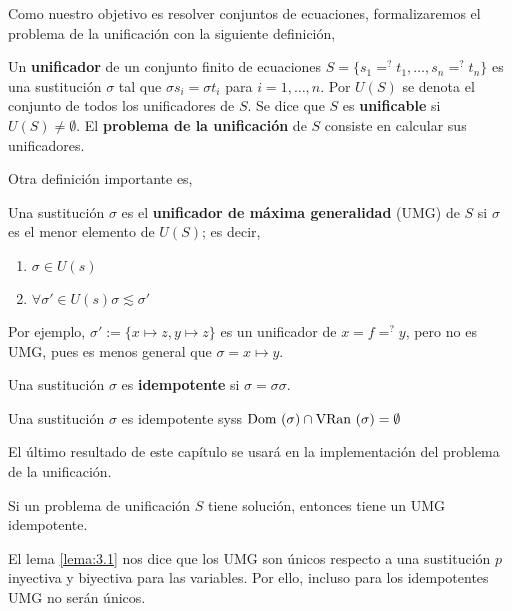 Como nuestro objetivo es resolver conjuntos de ecuaciones,
formalizaremos el problema de la unificación con la siguiente definición,

\begin{defi}
  Un \textbf{unificador} de un conjunto finito de ecuaciones
  $S = \{ s_1 =^? t_1, \dots, s_n =^? t_n\}$ es una sustitución $\sigma$
  tal que $\sigma s_i = \sigma t_i$ para $i = 1, \dots, n.$ Por $U(S)$
  se denota el conjunto de todos los unificadores de $S$. Se dice que
  $S$ es \textbf{unificable} si $U(S) \neq \emptyset$. El
  \textbf{problema de la unificación} de $S$ consiste en calcular sus
  unificadores.
\end{defi}

Otra definición importante es,

\begin{defi} 
  Una sustitución $\sigma$ es el \textbf{unificador de máxima
    generalidad} (UMG) de $S$ si $\sigma$ es el menor elemento de
  $U(S)$; es decir,
  \begin{enumerate}
  \item $\sigma \in U(s)$
  \item $\forall \sigma' \in U(s) \sigma \lesssim \sigma'$
  \end{enumerate}
\end{defi}

Por ejemplo, $\sigma ' := \{ x \mapsto z, y \mapsto z \}$ es un
unificador de $x=f =^? y$, pero no es UMG, pues es menos general que
$\sigma = {x \mapsto y}$.

\begin{defi}
  Una sustitución $\sigma$ es \textbf{idempotente} si $\sigma = \sigma \sigma$.
\end{defi}

\begin{lema} \label{lema:3.2} Una sustitución $\sigma$ es idempotente
  syss $\mbox{Dom }(\sigma) \cap \mbox{VRan }(\sigma) = \emptyset $
\end{lema}

El último resultado de este capítulo se usará en la implementación del
problema de la unificación.

\begin{teor}
  Si un problema de unificación $S$ tiene solución, entonces tiene un
  UMG idempotente.
\end{teor}

\begin{demo} %
  El lema \ref{lema:3.1} nos dice que los UMG son únicos respecto a
  una sustitución $p$ inyectiva y biyectiva para las variables. Por
  ello, incluso para los idempotentes UMG no serán únicos.
\end{demo}

